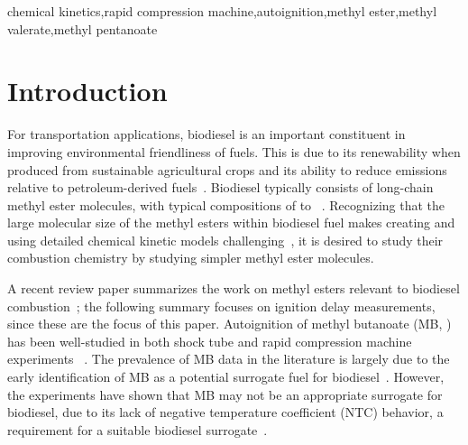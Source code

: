 \documentclass[letterpaper, review, sort&compress]{elsarticle}
\providecommand{\DIFadd}[1]{{\protect\color{blue}\uwave{#1}}} %
\providecommand{\DIFaddbegin}{} %
\providecommand{\DIFaddend}{} %
\newcommand{\DIFaddincludegraphics}[2][]{{\color{blue}\fbox{\DIFOincludegraphics[#1]{#2}}}} %
\DeclareRobustCommand{\DIFaddbegin}{\DIFOaddbegin \let\includegraphics\DIFaddincludegraphics} %
\DeclareRobustCommand{\DIFaddend}{\DIFOaddend \let\includegraphics\DIFOincludegraphics} %
\begin{document}
\begin{frontmatter}
\begin{abstract}
\end{abstract}

\begin{keyword}
    chemical kinetics\sep rapid compression machine\sep autoignition\sep methyl ester\sep methyl valerate\sep methyl pentanoate
\end{keyword}
\end{frontmatter}

\linenumbers

\section{Introduction}\label{sec:introduction}

For transportation applications, biodiesel is an important constituent in improving environmental
friendliness of fuels. This is due to its renewability when produced from sustainable agricultural
crops and its ability to reduce emissions relative to petroleum-derived fuels~\cite{Hoekman2012}.
Biodiesel typically consists of long-chain methyl ester molecules, with typical compositions of
 to ~\cite{Hoekman2012}. Recognizing that the large molecular size of the methyl
esters within biodiesel fuel makes creating and using detailed chemical kinetic models
challenging~\cite{Lai2011}, it is desired to study their combustion chemistry by studying simpler
methyl ester molecules.

A recent review paper summarizes the work on methyl esters relevant to biodiesel
combustion~\cite{Coniglio2013}; the following summary focuses on ignition delay measurements, since
these are the focus of this paper. Autoignition of methyl butanoate (MB, ) has been
well-studied in both shock tube and rapid compression machine experiments~
\cite{Metcalfe2007,Walton2009,Dooley2008,Akih-Kumgeh2010,Akih-Kumgeh2011,Hadj-Ali2009,Kumar2016}.
The prevalence of MB data in the literature is largely due to the early identification of MB as a
potential surrogate fuel for biodiesel~\cite{Fisher2000}. However, the \DIFaddbegin \DIFadd{literature }\DIFaddend experiments have
shown that MB may not be an appropriate surrogate for biodiesel, due to its lack of negative
temperature coefficient (NTC) behavior, a requirement for a suitable biodiesel
surrogate~\cite{Coniglio2013}.
\end{document}
